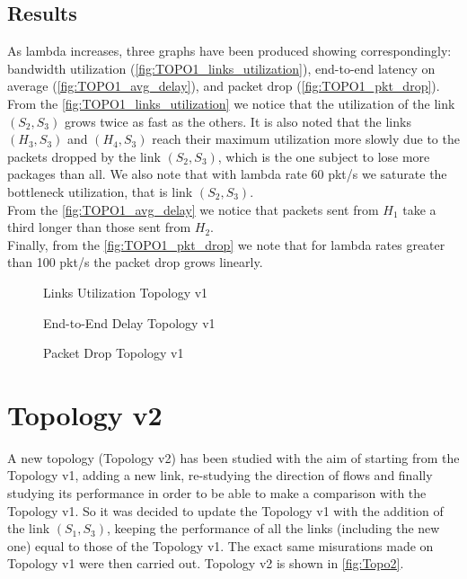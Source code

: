 \documentclass{article}
\begin{document}
\subsection{Results}
As lambda increases, three graphs have been produced showing correspondingly: bandwidth utilization (\autoref{fig:TOPO1_links_utilization}), end-to-end latency on average (\autoref{fig:TOPO1_avg_delay}), and packet drop (\autoref{fig:TOPO1_pkt_drop}).\\
From the \autoref{fig:TOPO1_links_utilization} we notice that the utilization of the link $(S_2, S_3)$ grows twice as fast as the others. It is also noted that the links $(H_3, S_3)$ and $(H_4, S_3)$ reach their maximum utilization more slowly due to the packets dropped by the link $(S_2, S_3)$, which is the one subject to lose more packages than all. We also note that with lambda rate 60 pkt/s we saturate the bottleneck utilization, that is link $(S_2, S_3)$.\\
From the \autoref{fig:TOPO1_avg_delay} we notice that packets sent from $H_1$ take a third longer than those sent from $H_2$.\\
Finally, from the \autoref{fig:TOPO1_pkt_drop} we note that for lambda rates greater than 100 pkt/s the packet drop grows linearly.
\begin{figure}[H]
    \centering
    
    \caption{Links Utilization Topology v1}
    \label{fig:TOPO1_links_utilization}
\end{figure}
\begin{figure}[H]
    \centering
    
    \caption{End-to-End Delay Topology v1}
    \label{fig:TOPO1_avg_delay}
\end{figure}
\begin{figure}[H]
    \centering
    
    \caption{Packet Drop Topology v1}
    \label{fig:TOPO1_pkt_drop}
\end{figure}

\section{Topology v2}
A new topology (Topology v2) has been studied with the aim of starting from the Topology v1, adding a new link, re-studying the direction of flows and finally studying its performance in order to be able to make a comparison with the Topology v1. So it was decided to update the Topology v1 with the addition of the link $(S_1, S_3)$, keeping the performance of all the links (including the new one) equal to those of the Topology v1. The exact same misurations made on Topology v1 were then carried out. Topology v2 is shown in \autoref{fig:Topo2}.
\end{document}
